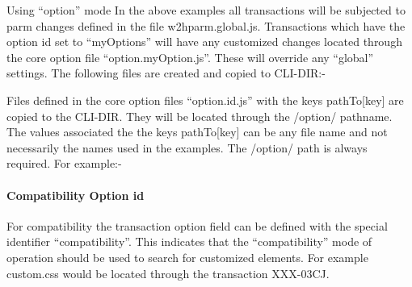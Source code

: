 \documentclass[letterpaper,10pt,english]{sphinxmanual}
\begin{document}
Using “option” mode In the above examples all transactions will be subjected to parm changes defined in the file w2hparm.global.js. Transactions which have the option id set to “myOptions” will have any customized changes located through the core option file “option.myOption.js”. These will override any “global” settings. The following files are created and copied to CLI-DIR:-

\begin{sphinxVerbatim}[commandchars=\\\{\}]
        
       
              
      
\end{sphinxVerbatim}

Files defined in the core option files “option.id.js” with the keys pathTo{[}key{]} are copied to the CLI-DIR. They will be located through the /option/ pathname. The values associated the the keys pathTo{[}key{]} can be any file name and not necessarily the names used in the examples. The /option/ path is always required. For example:-

\begin{sphinxVerbatim}[commandchars=\\\{\}]
      
 
\end{sphinxVerbatim}


\paragraph{Compatibility Option id}
\label{\detokenize{User_Guide:compatibility-option-id}}
For compatibility the transaction option field can be defined with the special identifier “compatibility”. This indicates that the “compatibility” mode of operation should be used to search for customized elements. For example custom.css would be located through the transaction XXX-03CJ.
\end{document}
